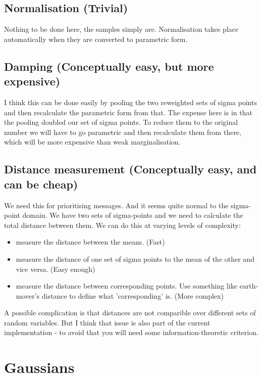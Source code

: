 \subsection{Normalisation (Trivial)}

Nothing to be done here, the samples simply are. Normalisation takes
place automatically when they are converted to parametric form.


\subsection{Damping (Conceptually easy, but more expensive)}

I think this can be done easily by pooling the two reweighted sets
of sigma points and then recalculate the parametric form from that.
The expense here is in that the pooling doubled our set of sigma points.
To reduce them to the original number we will have to go parametric
and then recalculate them from there, which will be more expensive
than weak marginalisation.


\subsection{Distance measurement (Conceptually easy, and can be cheap)}

We need this for prioritising messages. And it seems quite normal
to the sigma-point domain. We have two sets of sigma-points and we
need to calculate the total distance between them. We can do this
at varying levels of complexity:
\begin{itemize}
\item measure the distance between the means. (Fast)
\item measure the distance of one set of sigma points to the mean of the
other and vice versa. (Easy enough)
\item measure the distance between corresponding points. Use something like
earth-mover's distance to define what 'corresponding' is. (More complex)
\end{itemize}
A possible complication is that distances are not comparible over
different sets of random variables. But I think that issue is also
part of the current implementation - to avoid that you will need some
information-theoretic criterion.


\section{Gaussians}


